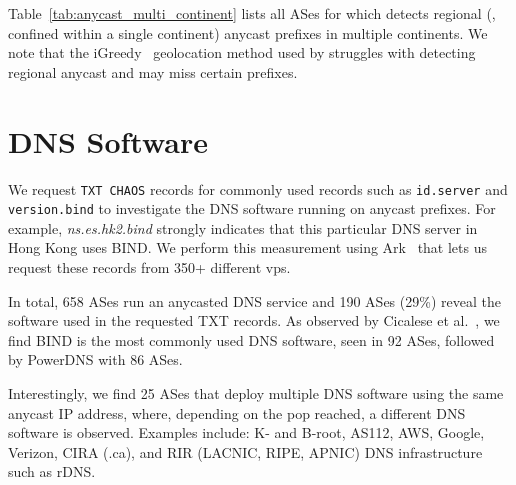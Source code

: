 Table~\ref{tab:anycast_multi_continent} lists all ASes for which \laces detects regional (\ie, confined within a single continent) anycast prefixes in multiple continents.
We note that the iGreedy~\cite{igreedy} geolocation method used by \laces struggles with detecting regional anycast and may miss certain prefixes.

\section{DNS Software}\label{app:dns-software}
We request \texttt{TXT CHAOS} records for commonly used records such as \texttt{id.server} and \texttt{version.bind} to investigate the DNS software running on anycast prefixes.
%
For example, \textit{ns.es.hk2.bind} strongly indicates that this particular DNS server in Hong Kong uses BIND\@.
%
We perform this measurement using Ark~\cite{ark} that lets us request these records from 350+ different \glspl{vp}.

In total, \num{658} ASes run an anycasted DNS service
and \num{190} ASes (29\%) reveal the software used in the requested TXT records.
%
As observed by Cicalese et al.~\cite{CicaleseEtAl_CharacterizingIPv4Anycast_2015}, we find BIND is the most commonly used DNS software, seen in \num{92} ASes, followed by PowerDNS with \num{86} ASes.

Interestingly, we find \num{25} ASes that deploy multiple DNS software using the same anycast IP address, where, depending on the \gls{pop} reached, a different DNS software is observed.
%
Examples include: K- and B-root, AS112, AWS, Google, Verizon, CIRA (.ca), and RIR (LACNIC, RIPE, APNIC) DNS infrastructure such as rDNS\@.
